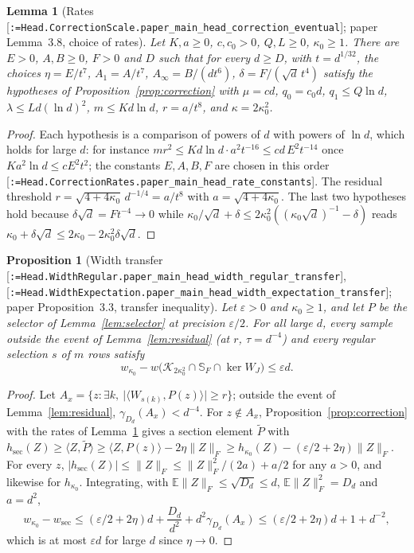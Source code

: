 \documentclass[11pt]{article}
\makeatletter
\newcommand{\formal@break}[1]{\@tfor\formal@tok:=#1\do{%
  \formal@tok
  \expandafter\ifx\formal@tok.\allowbreak\else
  \expandafter\ifx\formal@tok\_\allowbreak\fi\fi}}
\DeclareRobustCommand{\formal}[1]{\textnormal{[\texttt{\small\formal@break{#1}}]}}
\newcommand{\E}{\mathbb{E}}
\newcommand{\ip}[2]{\langle #1, #2\rangle}
\newcommand{\norm}[1]{\lVert #1\rVert}
\newcommand{\abs}[1]{\lvert #1\rvert}
\newcommand{\Fro}{F}
\newcommand{\sqd}{\sqrt{d}}
\newcommand{\cone}{\mathcal{K}}
\newcommand{\gauss}{\gamma}
\newcommand{\Dd}{D}
\theoremstyle{plain}
\newtheorem{proposition}[theorem]{Proposition}
\newtheorem{lemma}[theorem]{Lemma}
\theoremstyle{definition}
\makeatother
\begin{document}
\begin{lemma}[Rates \formal{Head.CorrectionScale.paper\_main\_head\_correction\_eventual}; paper Lemma~3.8, choice of rates]\label{lem:rates}
Let $K, a \ge 0$, $c, c_0 > 0$, $Q, L \ge 0$, $\kappa_0 \ge 1$. There are
$E > 0$, $A, B \ge 0$, $F > 0$ and $D$ such that for every $d \ge D$, with
$t = d^{1/32}$, the choices $\eta = E/t^7$, $A_1 = A/t^7$, $A_\infty = B/(dt^6)$,
$\delta = F/(\sqd\,t^4)$ satisfy the hypotheses of
Proposition~\ref{prop:correction} with $\mu = cd$, $q_0 = c_0d$, $q_1 \le Q\ln d$,
$\lambda \le Ld(\ln d)^2$, $m \le Kd\ln d$, $r = a/t^8$, and $\kappa = 2\kappa_0^2$.
\end{lemma}

\begin{proof}
Each hypothesis is a comparison of powers of $d$ with powers of $\ln d$,
which holds for large $d$: for instance $mr^2 \le Kd\ln d\cdot a^2t^{-16} \le cd\,E^2t^{-14}$
once $K a^2\ln d \le cE^2t^2$; the constants $E, A, B, F$ are chosen in this
order \formal{Head.CorrectionRates.paper\_main\_head\_rate\_constants}. The
residual threshold $r = \sqrt{4 + 4\kappa_0}\,d^{-1/4} = a/t^8$ with
$a = \sqrt{4 + 4\kappa_0}$. The last two hypotheses hold because
$\delta\sqd = Ft^{-4} \to 0$ while $\kappa_0/\sqd + \delta \le 2\kappa_0^2((\kappa_0\sqd)^{-1} - \delta)$
reads $\kappa_0 + \delta\sqd \le 2\kappa_0 - 2\kappa_0^2\delta\sqd$.
\end{proof}

\begin{proposition}[Width transfer \formal{Head.WidthRegular.paper\_main\_head\_width\_regular\_transfer}, \formal{Head.WidthExpectation.paper\_main\_head\_width\_expectation\_transfer}; paper Proposition~3.3, transfer inequality]\label{prop:width_transfer}
Let $\varepsilon > 0$ and $\kappa_0 \ge 1$, and let $P$ be the selector of
Lemma~\ref{lem:selector} at precision $\varepsilon/2$. For all large $d$,
every sample outside the event of Lemma~\ref{lem:residual} (at $r$, $\tau = d^{-4}$)
and every regular selection $s$ of $m$ rows satisfy
\[
w_{\kappa_0} - w\bigl(\cone_{2\kappa_0^2}\cap\mathbb{S}_\Fro\cap\ker W_J\bigr) \le \varepsilon d .
\]
\end{proposition}

\begin{proof}
Let $A_x = \{z : \exists k,\ \abs{\ip{W_{s(k)}}{P(z)}} \ge r\}$; outside the
event of Lemma~\ref{lem:residual}, $\gauss_{\Dd_d}(A_x) < d^{-4}$. For
$z \notin A_x$, Proposition~\ref{prop:correction} with the rates of
Lemma~\ref{lem:rates} gives a section element $\tilde P$ with
$h_{\mathrm{sec}}(Z) \ge \ip{Z}{\tilde P} \ge \ip{Z}{P(z)} - 2\eta\norm{Z}_\Fro \ge h_{\kappa_0}(Z) - (\varepsilon/2 + 2\eta)\norm{Z}_\Fro$.
For every $z$, $\abs{h_{\mathrm{sec}}(Z)} \le \norm{Z}_\Fro \le \norm{Z}_\Fro^2/(2a) + a/2$
for any $a > 0$, and likewise for $h_{\kappa_0}$. Integrating, with
$\E\norm{Z}_\Fro \le \sqrt{\Dd_d} \le d$, $\E\norm{Z}_\Fro^2 = \Dd_d$ and $a = d^2$,
\[
w_{\kappa_0} - w_{\mathrm{sec}} \le (\varepsilon/2 + 2\eta)d + \frac{\Dd_d}{d^2} + d^2\gauss_{\Dd_d}(A_x) \le (\varepsilon/2 + 2\eta)d + 1 + d^{-2},
\]
which is at most $\varepsilon d$ for large $d$ since $\eta \to 0$.
\end{proof}
\end{document}
